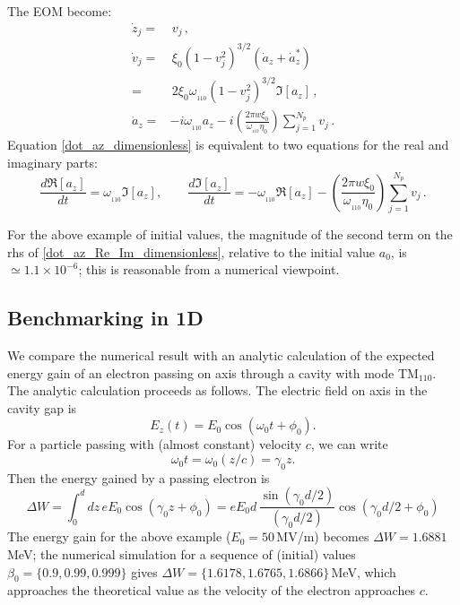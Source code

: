 \documentclass[11pt]{article}
\begin{document}
The EOM become:
%
\begin{align}
\dot{z}_j =&\, v_j \label{dot_zj_dimensionless}\, , \\
\dot{v}_j =&\, \xi_0 \left(1-v_j^2 \right)^{3/2} (\dot{a}_z + \dot{a}_z^*)
\nonumber\\
 =&\, 2\xi_0\omega_{_{110}}\left(1-v_j^2\right)^{3/2}\Im[a_z]
\, ,\label{dot_vj_dimensionless} \\
\dot{a}_z =& -i\omega_{_{110}}a_z - i\left(\frac{2\pi w\xi_0}{\omega_{_{110}}\eta_0}\right) \sum_{j=1}^{N_p}v_j\, .
\label{dot_az_dimensionless}
\end{align}
%
Equation \eqref{dot_az_dimensionless} is equivalent to two equations for the real and
imaginary parts:
%
\begin{equation}
\frac{d\Re[{a}_z]}{dt} = \omega_{_{110}}\Im[a_z], \qquad 
\frac{d\Im[{a}_z]}{dt} = -\omega_{_{110}}\Re[a_z] - \left(\frac{2\pi w\xi_0}{\omega_{_{110}}\eta_0}\right) \sum_{j=1}^{N_p}v_j\, .
\label{dot_az_Re_Im_dimensionless}
\end{equation}
%

For the above example of initial values, the magnitude of the second term on the rhs of \eqref{dot_az_Re_Im_dimensionless},
relative to the initial value $a_0$, is $\simeq 1.1\times 10^{-6}$; this is reasonable from a numerical viewpoint.

\newpage
\subsection{Benchmarking  in 1D}
\label{Benchmarking}

We compare the numerical result with an analytic calculation of the expected energy gain of an electron 
passing on axis through a cavity with mode TM$_{110}$. The analytic calculation proceeds as follows. 
The electric field on axis in the cavity gap is
%
\begin{equation}
E_z(t) = E_0 \cos(\omega_0 t + \phi_0).
\label{E_gap}
\end{equation}
%
For a particle passing with (almost constant) velocity $c$, we can write
%
\begin{equation}
\omega_0 t = \omega_0 (z/c) = \gamma_0 z.
\end{equation}
%
Then the energy gained by a passing electron is
%
\begin{equation}
\Delta W = \int_{0}^{d}\! dz\, e E_0 \cos(\gamma_0 z+\phi_0) = eE_0d\, \frac{\sin(\gamma_0d/2)}{(\gamma_0d/2)}\cos(\gamma_0d/2+\phi_0)
\label{Delta_W}
\end{equation}
%
The energy gain for the above example ($E_0 = 50\,$MV/m) becomes $\Delta W = 1.6881\,$MeV; the numerical
simulation for a sequence of (initial) values $\beta_0=\{0.9, 0.99, 0.999\}$ gives 
$\Delta W =\{1.6178, 1.6765, 1.6866 \}\,$MeV, which approaches the theoretical value as the velocity of 
the electron approaches $c$.
\end{document}
